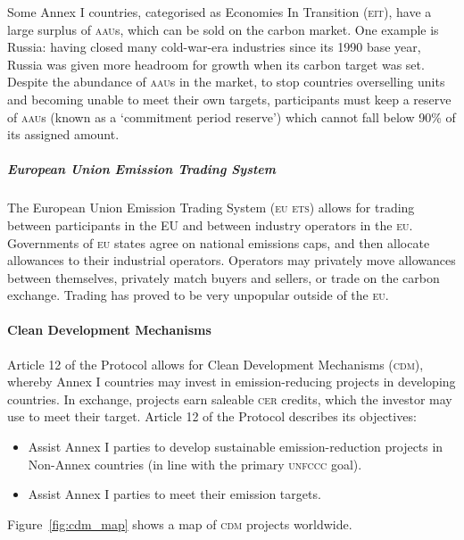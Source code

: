 Some Annex I countries, categorised as Economies In Transition (\textsc{eit}), have a large surplus of \textsc{aau}s, which can be sold on the carbon market. One example is Russia: having closed many cold-war-era industries since its 1990 base year, Russia was given more headroom for growth when its carbon target was set. Despite the abundance of \textsc{aau}s in the market, to stop countries overselling units and becoming unable to meet their own targets, participants must keep a reserve of \textsc{aau}s (known as a `commitment period reserve') which cannot fall below 90\% of its assigned amount.

\subparagraph{European Union Emission Trading System}

The European Union Emission Trading System (\textsc{eu ets}) allows for trading between participants in the EU and between industry operators in the \textsc{eu}. Governments of \textsc{eu} states agree on national emissions caps, and then allocate allowances to their industrial operators. Operators may privately move allowances between themselves, privately match buyers and sellers, or trade on the carbon exchange. Trading has proved to be very unpopular outside of the \textsc{eu}.~\cite{Grubb-09}

\paragraph{Clean Development Mechanisms}

Article 12 of the Protocol allows for Clean Development Mechanisms (\textsc{cdm}), whereby Annex I countries may invest in emission-reducing projects in developing countries. In exchange, projects earn saleable \textsc{cer} credits, which the investor may use to meet their target. Article 12 of the Protocol describes its objectives:

\begin{itemize}
	\item Assist Annex I parties to develop sustainable emission-reduction projects in Non-Annex countries (in line with the primary \textsc{unfccc} goal).
	\item Assist Annex I parties to meet their emission targets.
\end{itemize}

Figure~\ref{fig:cdm_map} shows a map of \textsc{cdm} projects worldwide.

